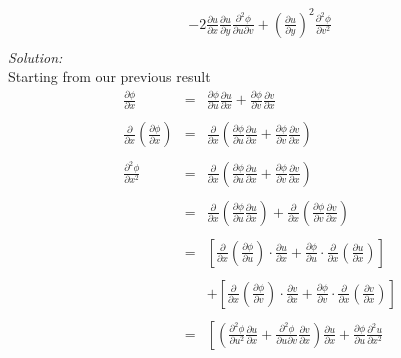 \documentclass[10pt]{amsart}
\theoremstyle{nonumberplain}
\begin{document}
\begin{enumerate}[label={\bf {\arabic*}:}]
\begin{eqnarray*}
							- 2 \frac{\partial u}{\partial x} \frac{\partial u}{\partial y} \frac{\partial^2 \phi}{\partial u \partial v}
							+ \left(\frac{\partial u}{\partial y}\right)^2 \frac{\partial^2 \phi}{\partial v^2} \\
\end{eqnarray*}
\textit{Solution:} \\
Starting from our previous result
\begin{eqnarray*}
\frac{\partial\phi}{\partial x} &=& \frac{\partial\phi}{\partial u} \frac{\partial u}{\partial x} + \frac{\partial\phi}{\partial v} \frac{\partial v}{\partial x} \\ \\
\frac{\partial}{\partial x} \left(\frac{\partial\phi}{\partial x}\right) &=& \frac{\partial}{\partial x} \left(\frac{\partial\phi}{\partial u} \frac{\partial u}{\partial x} + \frac{\partial\phi}{\partial v} \frac{\partial v}{\partial x}\right) \\ \\
\frac{\partial^2\phi}{\partial x^2} &=& \frac{\partial}{\partial x} \left(\frac{\partial\phi}{\partial u} \frac{\partial u}{\partial x} + \frac{\partial\phi}{\partial v} \frac{\partial v}{\partial x}\right) \\ \\
						&=& \frac{\partial}{\partial x} \left(\frac{\partial\phi}{\partial u} \frac{\partial u}{\partial x}\right)
							+ \frac{\partial}{\partial x}  \left(\frac{\partial\phi}{\partial v} \frac{\partial v}{\partial x}\right) \\ \\
						&=& \left[ 
							\frac{\partial}{\partial x} \left( \frac{\partial\phi}{\partial u} \right) \cdot \frac{\partial u}{\partial x}
							+ \frac{\partial\phi}{\partial u} \cdot \frac{\partial}{\partial x} \left(\frac{\partial u}{\partial x} \right)
						\right] \\ \\
						&& + \left[ 
							\frac{\partial}{\partial x} \left( \frac{\partial\phi}{\partial v} \right) \cdot \frac{\partial v}{\partial x}
							+ \frac{\partial\phi}{\partial v} \cdot \frac{\partial}{\partial x} \left(\frac{\partial v}{\partial x} \right)
						\right] \\ \\
						&=& \left[ 
							\left( \frac{\partial^2 \phi}{\partial u^2} \frac{\partial u}{\partial x} + \frac{\partial^2 \phi}{\partial u \partial v} \frac{\partial v}{\partial x} \right) \frac{\partial u}{\partial x}
							+ \frac{\partial\phi}{\partial u} \frac{\partial^2 u}{\partial x^2}

\end{eqnarray*}
\end{enumerate}
\end{document}
